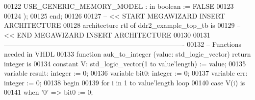 \begin{DoxyCode}
00122         \textcolor{vhdlchar}{USE_GENERIC_MEMORY_MODEL} \textcolor{vhdlchar}{:} \textcolor{keywordflow}{in} \textcolor{comment}{boolean} \textcolor{vhdlchar}{:=} \textcolor{vhdlchar}{FALSE}
00123 
00124     \textcolor{vhdlchar}{)};
00125 \textcolor{keywordflow}{end};
00126 
00127 \textcolor{keyword}{-- << START MEGAWIZARD INSERT ARCHITECTURE}
00128 \textcolor{keywordflow}{architecture} rtl \textcolor{keywordflow}{of} ddr2_example_top_tb is
00129 \textcolor{keyword}{-- << END MEGAWIZARD INSERT ARCHITECTURE}
00130 
00131 \textcolor{keyword}{    -------------------------------------------------------------------------------}
00132 \textcolor{keyword}{    -- Functions needed in VHDL }
00133     \textcolor{keywordflow}{function} auk_to_integer (\textcolor{vhdlkeyword}{value}: \textcolor{comment}{std\_logic\_vector}) \textcolor{keywordflow}{return} \textcolor{comment}{integer} \textcolor{keywordflow}{is}
00134     \textcolor{keywordflow}{constant} \textcolor{vhdlchar}{V}\textcolor{vhdlchar}{:} \textcolor{comment}{std\_logic\_vector}\textcolor{vhdlchar}{(}\textcolor{vhdllogic}{}\textcolor{vhdllogic}{1} \textcolor{keywordflow}{to} \textcolor{vhdlkeyword}{value}\textcolor{vhdlchar}{'}\textcolor{vhdlkeyword}{length}\textcolor{vhdlchar}{)} \textcolor{vhdlchar}{:=} \textcolor{vhdlkeyword}{value};
00135     \textcolor{keywordflow}{variable} \textcolor{vhdlchar}{result}\textcolor{vhdlchar}{:} \textcolor{comment}{integer} \textcolor{vhdlchar}{:=} \textcolor{vhdllogic}{}\textcolor{vhdllogic}{0};
00136     \textcolor{keywordflow}{variable} \textcolor{vhdlchar}{bit0}\textcolor{vhdlchar}{:} \textcolor{comment}{integer} \textcolor{vhdlchar}{:=} \textcolor{vhdllogic}{}\textcolor{vhdllogic}{0};
00137     \textcolor{keywordflow}{variable} \textcolor{vhdlchar}{err}\textcolor{vhdlchar}{:} \textcolor{comment}{integer} \textcolor{vhdlchar}{:=} \textcolor{vhdllogic}{}\textcolor{vhdllogic}{0};
00138 \textcolor{vhdlkeyword}{    begin}
00139         \textcolor{keywordflow}{for} \textcolor{vhdlchar}{i} \textcolor{keywordflow}{in} \textcolor{vhdllogic}{}\textcolor{vhdllogic}{1} \textcolor{keywordflow}{to} \textcolor{vhdlkeyword}{value}\textcolor{vhdlchar}{'}\textcolor{vhdlkeyword}{length} \textcolor{keywordflow}{loop}
00140             \textcolor{keywordflow}{case} \textcolor{vhdlchar}{V}\textcolor{vhdlchar}{(}\textcolor{vhdlchar}{i}\textcolor{vhdlchar}{)} \textcolor{keywordflow}{is}
00141             \textcolor{keywordflow}{when} \textcolor{vhdlchar}{'}\textcolor{vhdllogic}{}\textcolor{vhdllogic}{0}\textcolor{vhdlchar}{'} \textcolor{vhdlchar}{=}\textcolor{vhdlchar}{>} \textcolor{vhdlchar}{bit0} \textcolor{vhdlchar}{:=} \textcolor{vhdllogic}{}\textcolor{vhdllogic}{0};

\end{DoxyCode}
